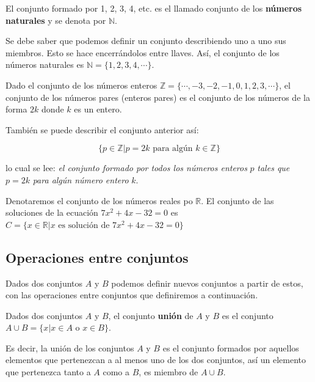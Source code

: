 \documentclass[12pt,]{krantz}
\theoremstyle{definition}
\theoremstyle{definition}
\theoremstyle{definition}
\theoremstyle{remark}
\let\BeginKnitrBlock\begin \let\EndKnitrBlock\end
\begin{document}
\BeginKnitrBlock{example}
\protect\hypertarget{exm:unnamed-chunk-8}{}{\label{exm:unnamed-chunk-8} }El
conjunto formado por 1, 2, 3, 4, etc. es el llamado conjunto de los
\textbf{números naturales} y se denota por \(\mathbb{N}\).

Se debe saber que podemos definir un conjunto describiendo uno a uno sus
miembros. Esto se hace encerrándolos entre llaves. Así, el conjunto de
los números naturales es \(\mathbb{N}=\{1,2,3,4,\cdots\}\).
\EndKnitrBlock{example}

\BeginKnitrBlock{example}
\protect\hypertarget{exm:unnamed-chunk-9}{}{\label{exm:unnamed-chunk-9}
}Dado el conjunto de los números enteros
\(\mathbb{Z}=\{\cdots,-3,-2,-1,0,1,2,3,\cdots \}\), el conjunto de los
números pares (enteros pares) es el conjunto de los números de la forma
\(2k\) donde \(k\) es un entero.

También se puede describir el conjunto anterior así:

\[\{p\in\mathbb{Z}| p=2k \mbox{ para algún } k\in\mathbb{Z} \}\]

lo cual se lee: \emph{el conjunto formado por todos los números enteros}
\(p\) \emph{tales que} \(p=2k\) \emph{para algún número entero} \(k\).
\EndKnitrBlock{example}

\BeginKnitrBlock{example}
\protect\hypertarget{exm:unnamed-chunk-10}{}{\label{exm:unnamed-chunk-10}
}Denotaremos el conjunto de los números reales po \(\mathbb{R}\). El
conjunto de las soluciones de la ecuación \(7x^{2}+4x-32=0\) es
\(C=\{x\in\mathbb{R}| x \mbox{ es solución de } 7x^{2}+4x-32=0 \}\)
\EndKnitrBlock{example}

\subsection{Operaciones entre
conjuntos}\label{operaciones-entre-conjuntos}

Dados dos conjuntos \(A\) y \(B\) podemos definir nuevos conjuntos a
partir de estos, con las operaciones entre conjuntos que definiremos a
continuación.

\BeginKnitrBlock{definition}
\protect\hypertarget{def:uniondeconjuntos}{}{\label{def:uniondeconjuntos}
}Dados dos conjuntos \(A\) y \(B\), el conjunto \textbf{unión} de \(A\)
y \(B\) es el conjunto \(A\cup B = \{ x| x\in A \mbox{ o } x\in B \}\).
\EndKnitrBlock{definition}

Es decir, la unión de los conjuntos \(A\) y \(B\) es el conjunto
formados por aquellos elementos que pertenezcan a al menos uno de los
dos conjuntos, así un elemento que pertenezca tanto a \(A\) como a
\(B\), es miembro de \(A\cup B\).
\end{document}

